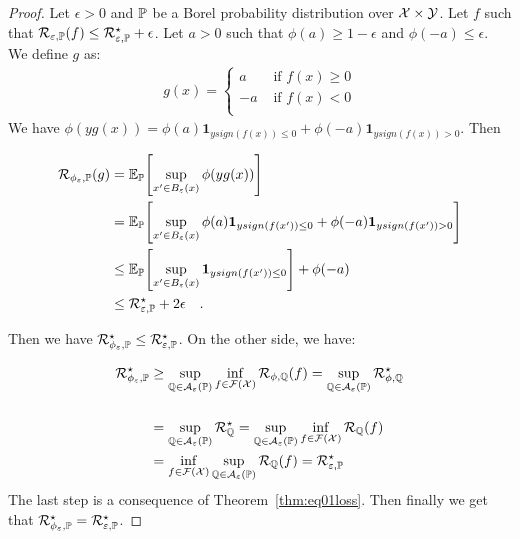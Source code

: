     \begin{proof}
    Let $\epsilon>0$ and $\mathbb{P}$ be a Borel probability distribution over $\mathcal{X}\times\mathcal{Y}$. Let $f$ such that $\mathcal{R}_{\varepsilon,\mathbb{P}}(f) \leq \mathcal{R}_{\varepsilon,\mathbb{P}}^\star +\epsilon$. Let $a>0$ such that $\phi(a)\geq 1-\epsilon$ and $\phi(-a)\leq\epsilon$. We define $g$ as: 
    \begin{align*}
         g(x)= \left\{
        \begin{array}{ll}
        a&\text{ if } f(x)\geq 0\\
        -a&\text{ if } f(x)< 0\\
      \end{array}
      \right.
    \end{align*}
    We have $\phi(yg(x)) = \phi(a) \mathbf{1}_{y sign(f(x))\leq 0}+  \phi(-a) \mathbf{1}_{y sign(f(x))>0}$. Then
    
    \begin{align*}
      \risk_{\phi_\varepsilon,\PP}(g) & = \EE_\PP\left[\sup_{x'\in B_\varepsilon(x)}\phi(yg(x))\right]\\
      & = \EE_\PP\left[\sup_{x'\in B_\varepsilon(x)}\phi(a) \mathbf{1}_{y sign(f(x'))\leq 0}+  \phi(-a) \mathbf{1}_{y sign(f(x'))>0}\right]\\
      &\leq  \EE_\PP\left[\sup_{x'\in B_\varepsilon(x)}\mathbf{1}_{y sign(f(x'))\leq 0}\right]+\phi(-a)\\
      &\leq \risk_{\varepsilon,\PP}^\star + 2\epsilon\quad.
    \end{align*}
    
    Then we have $\mathcal{R}_{\phi_\varepsilon,\mathbb{P}}^\star\leq \mathcal{R}_{\varepsilon,\mathbb{P}}^\star$.
    On the other side, we have: 
    
    \begin{align*}
     \mathcal{R}_{\phi_\varepsilon,\mathbb{P}}^\star & \geq \sup_{\mathbb{Q}\in\mathcal{A}_\varepsilon(\mathbb{P})}  \inf_{f\in\mathcal{F}(\mathcal{X})} \mathcal{R}_{\phi,\mathbb{Q}}(f) = \sup_{\mathbb{Q}\in\mathcal{A}_\varepsilon(\mathbb{P})}  \mathcal{R}_{\phi,\mathbb{Q}}^\star\\
      \\ &= \sup_{\mathbb{Q}\in\mathcal{A}_\varepsilon(\mathbb{P})}  \mathcal{R}_{\mathbb{Q}}^\star= \sup_{\mathbb{Q}\in\mathcal{A}_\varepsilon(\mathbb{P})}\inf_{f\in\mathcal{F}(\mathcal{X})} \mathcal{R}_{\mathbb{Q}}(f)  \\
      & =  \inf_{f\in\mathcal{F}(\mathcal{X})} \sup_{\mathbb{Q}\in\mathcal{A}_\varepsilon(\mathbb{P})}\mathcal{R}_{\mathbb{Q}}(f) = \mathcal{R}_{\varepsilon,\mathbb{P}}^\star \\
    \end{align*}
The last step is a consequence of Theorem~\ref{thm:eq01loss}. Then finally we get that $\mathcal{R}_{\phi_\varepsilon,\mathbb{P}}^\star=  \mathcal{R}_{\varepsilon,\mathbb{P}}^\star$.
    
    \end{proof}



